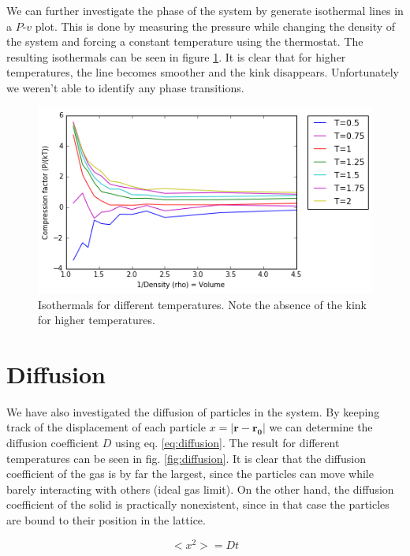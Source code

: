 \documentclass[12pt,a4paper]{report}
\begin{document}
We can further investigate the phase of the system by generate isothermal lines in a $P$-$v$ plot. This is done by measuring the pressure while changing the density of the system and forcing a constant temperature using the thermostat. The resulting isothermals can be seen in figure \ref{fig:isothermals}. It is clear that for higher temperatures, the line becomes smoother and the kink disappears. Unfortunately we weren't able to identify any phase transitions.

\begin{figure}[H]
\centering
\includegraphics[scale=0.5]{Isothermen.png}
\caption{Isothermals for different temperatures. Note the absence of the kink for higher temperatures.}
\label{fig:isothermals}
\end{figure}

\section{Diffusion}

We have also investigated the diffusion of particles in the system.
By keeping track of the displacement of each particle $x = |\mathbf{r}-\mathbf{r_0}|$ we can determine the diffusion coefficient $D$ using eq. \ref{eq:diffusion}. The result for different temperatures can be seen in fig. \ref{fig:diffusion}. It is clear that the diffusion coefficient of the gas is by far the largest, since the particles can move while barely interacting with others (ideal gas limit). On the other hand, the diffusion coefficient of the solid is practically nonexistent, since in that case the particles are bound to their position in the lattice.

\begin{equation}\label{eq:diffusion}
	<x^2> = D t
\end{equation}
\end{document}
